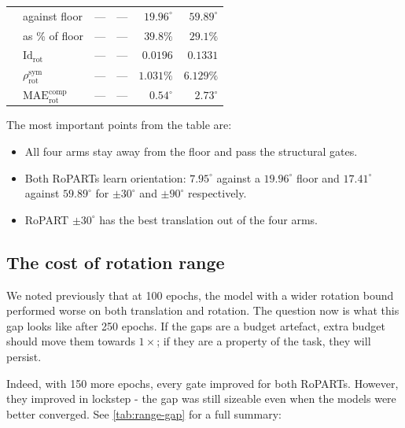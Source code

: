 \documentclass[final_report.tex]{subfiles}
\begin{document}
\begin{table}[htbp]
\begin{tabular}{@{}l l r r r r@{}}
      & \quad against floor   & --- & --- & $19.96^\circ$ & $59.89^\circ$ \\
      & \quad as \% of floor  & --- & --- & $39.8\%$ & $\mathbf{29.1\%}$ \\
      & $\mathrm{Id}_{\mathrm{rot}}$ & --- & --- & $0.0196$ & $0.1331$ \\
      & $\rho^{\mathrm{sym}}_{\mathrm{rot}}$ & --- & --- & $1.031\%$ & $6.129\%$ \\
      & $\mathrm{MAE}^{\mathrm{comp}}_{\mathrm{rot}}$ & --- & --- & $0.54^\circ$ & $2.73^\circ$ \\
    \bottomrule
  \end{tabular}
\end{table}

The most important points from the table are:
\begin{itemize}
\item All four arms stay away from the floor and pass the structural gates.
\item Both RoPARTs learn orientation: $7.95^\circ$ against a $19.96^\circ$ floor and $17.41^\circ$ against $59.89^\circ$ for $\pm30^\circ$ and $\pm90^\circ$ respectively.
\item RoPART $\pm30^\circ$ has the best translation out of the four arms.
\end{itemize}

\subsection{The cost of rotation range}\label{sec:range-cost}
We noted previously that at 100 epochs, the model with a wider rotation bound performed worse on both translation and rotation. The question now is what this gap looks like after 250 epochs. If the gaps are a budget artefact, extra budget should move them towards $1\times$; if they are a property of the task, they will persist.

Indeed, with 150 more epochs, every gate improved for both RoPARTs. However, they improved in lockstep - the gap was still sizeable even when the models were better converged. See \cref{tab:range-gap} for a full summary:
\end{document}
